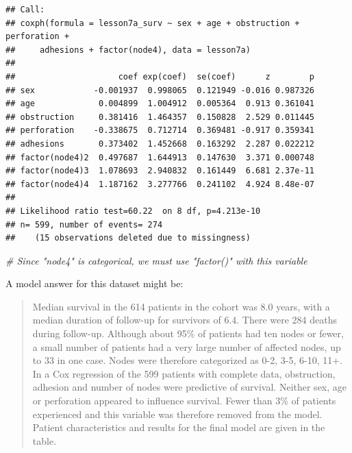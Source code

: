 \documentclass[]{book}
\newenvironment{Shaded}{\begin{snugshade}}{\end{snugshade}}
\newcommand{\CommentTok}[1]{\textcolor[rgb]{0.56,0.35,0.01}{\textit{#1}}}
\begin{document}
\begin{verbatim}
## Call:
## coxph(formula = lesson7a_surv ~ sex + age + obstruction + perforation + 
##     adhesions + factor(node4), data = lesson7a)
## 
##                     coef exp(coef)  se(coef)      z        p
## sex            -0.001937  0.998065  0.121949 -0.016 0.987326
## age             0.004899  1.004912  0.005364  0.913 0.361041
## obstruction     0.381416  1.464357  0.150828  2.529 0.011445
## perforation    -0.338675  0.712714  0.369481 -0.917 0.359341
## adhesions       0.373402  1.452668  0.163292  2.287 0.022212
## factor(node4)2  0.497687  1.644913  0.147630  3.371 0.000748
## factor(node4)3  1.078693  2.940832  0.161449  6.681 2.37e-11
## factor(node4)4  1.187162  3.277766  0.241102  4.924 8.48e-07
## 
## Likelihood ratio test=60.22  on 8 df, p=4.213e-10
## n= 599, number of events= 274 
##    (15 observations deleted due to missingness)
\end{verbatim}

\begin{Shaded}
\begin{Highlighting}[]
\CommentTok{# Since "node4" is categorical, we must use "factor()" with this variable}
\end{Highlighting}
\end{Shaded}

A model answer for this dataset might be:

\begin{quote}
Median survival in the 614 patients in the cohort was 8.0 years, with a median duration of follow-up for survivors of 6.4. There were 284 deaths during follow-up. Although about 95\% of patients had ten nodes or fewer, a small number of patients had a very large number of affected nodes, up to 33 in one case. Nodes were therefore categorized as 0-2, 3-5, 6-10, 11+. In a Cox regression of the 599 patients with complete data, obstruction, adhesion and number of nodes were predictive of survival. Neither sex, age or perforation appeared to influence survival. Fewer than 3\% of patients experienced and this variable was therefore removed from the model. Patient characteristics and results for the final model are given in the table.
\end{quote}
\end{document}
